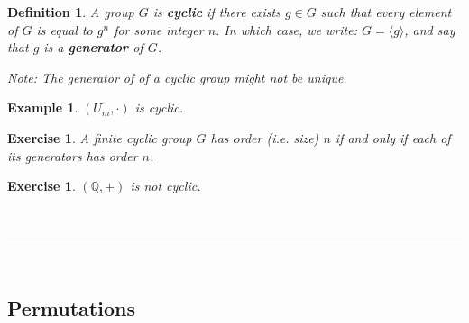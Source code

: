 \documentclass[a4paper,12pt]{report}
\newcounter{statement}
\numberwithin{statement}{chapter}
\newtheorem{defn}[statement]{Definition}
\newtheorem{eg}[statement]{\bf Example}
\newtheorem{ex}[statement]{\bf Exercise}
\numberwithin{equation}{chapter}
\numberwithin{section}{chapter}
\numberwithin{subsection}{section}
\begin{document}
\begin{defn}
A group $G$ is  {\bf cyclic}  if there exists $g \in G$ such that every element of $G$ is equal to $g^n$
for some integer $n$.
In which case, we write: $G = \langle g \rangle$, and say that $g$ is a  {\bf generator}  of $G$.


Note: The generator of of a cyclic group might not be unique.

\end{defn}
\begin{eg}


$(U_m, \cdot)$ is cyclic.

\end{eg}
\begin{ex}

A finite cyclic group $G$ has order (i.e. size) $n$
if and only if each of its generators has order $n$.

\end{ex}
\begin{ex}

$(\mathbb{Q}, +)$ is not cyclic.

\end{ex}


\quad\\\hrule
\quad\\
\subsection*{Permutations}
\end{document}
